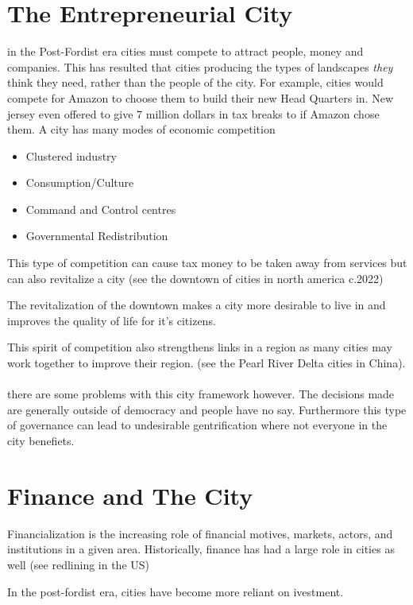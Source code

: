 \documentclass[12pt]{book}
\begin{document}
\section*{The Entrepreneurial City}
in the Post-Fordist era cities must compete to attract people, money and companies. This has resulted that 
cities producing the types of landscapes \textit{they} think they need, rather than the people of the city.
For example, cities would compete for Amazon to choose them to build their new Head Quarters in. New jersey
even offered to give 7 million dollars in tax breaks to if Amazon chose them.
A city has many modes of economic competition
\begin{itemize}
        \item Clustered industry
        \item Consumption/Culture
        \item Command and Control centres
        \item Governmental Redistribution
\end{itemize}

This type of competition can cause tax money to be taken away from services but can also revitalize a city (see 
the downtown of cities in north america c.2022)

The revitalization of the downtown makes a city more desirable to live in and improves the quality 
of life for it's citizens.

This spirit of competition also strengthens links in a region as many cities may work together to improve their region.
(see the Pearl River Delta cities in China).
\paragraph*{}
there are some problems with this city framework however.
The decisions made are generally outside of democracy and people have no say. Furthermore this type of governance can
lead to undesirable gentrification where not everyone in the city benefiets.

\section*{Finance and The City}
Financialization is the increasing role of financial motives, markets, actors, and institutions in a given area.
Historically, finance has had a large role in cities as well (see redlining in the US)

In the post-fordist era, cities have become more reliant on ivestment. 
\end{document}
